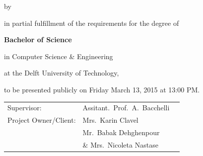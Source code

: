 \begin{titlepage}

\begin{center}


\vspace*{2\bigskipamount}

{\makeatletter
\titlestyle\color{tudelft-cyan}\Huge\@title
\makeatother}

{\makeatletter
\ifx\@subtitle\undefined\else
    \bigskip
    \titlefont\titleshape\LARGE\@subtitle
\fi
\makeatother}

\bigskip
\bigskip

by

\bigskip
\bigskip

{\makeatletter
\titlefont\Large\bfseries\@author
\makeatother}

\vfill

in partial fulfillment of the requirements for the degree of

\bigskip
\bigskip

{\bfseries Bachelor of Science}

in Computer Science \& Engineering

\bigskip
\bigskip

at the Delft University of Technology,

to be presented publicly on Friday March 13, 2015 at 13:00 PM.


\vfill

\begin{tabular}{lll}
    Supervisor: & Assitant.\ Prof.\  A.\ Bacchelli \\
     Project Owner/Client: 
        & Mrs.\ Karin Clavel \\ 
        & Mr.\ Babak Dehghenpour \\
        & \& Mrs.\ Nicoleta Nastase



\end{tabular}
\end{center}
\end{titlepage}
